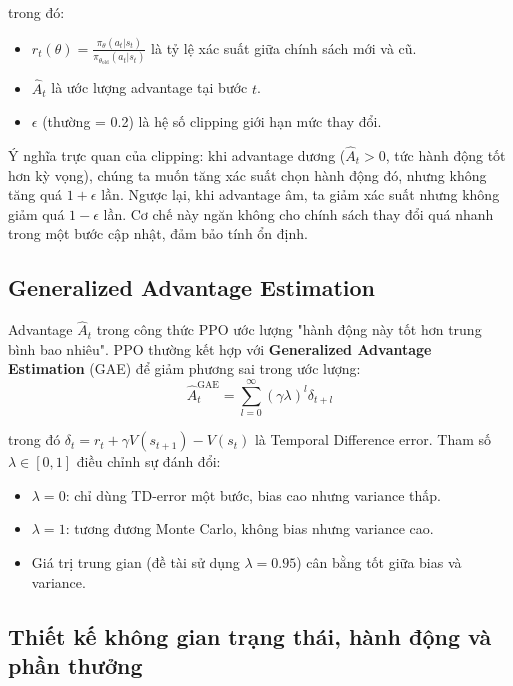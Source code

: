 trong đó:
\begin{itemize}
  \item $r_t(\theta) = \frac{\pi_\theta(a_t | s_t)}{\pi_{\theta_{\text{old}}}(a_t | s_t)}$ là tỷ lệ xác suất giữa chính sách mới và cũ.
  \item $\hat{A}_t$ là ước lượng advantage tại bước $t$.
  \item $\epsilon$ (thường = 0.2) là hệ số clipping giới hạn mức thay đổi.
\end{itemize}

Ý nghĩa trực quan của clipping: khi advantage dương ($\hat{A}_t > 0$, tức hành động tốt hơn kỳ vọng), chúng ta muốn tăng xác suất chọn hành động đó, nhưng không tăng quá $1 + \epsilon$ lần. Ngược lại, khi advantage âm, ta giảm xác suất nhưng không giảm quá $1 - \epsilon$ lần. Cơ chế này ngăn không cho chính sách thay đổi quá nhanh trong một bước cập nhật, đảm bảo tính ổn định.

\subsection{Generalized Advantage Estimation}

Advantage $\hat{A}_t$ trong công thức PPO ước lượng "hành động này tốt hơn trung bình bao nhiêu". PPO thường kết hợp với \textbf{Generalized Advantage Estimation} (GAE) để giảm phương sai trong ước lượng:
\begin{equation}
  \hat{A}_t^{\text{GAE}} = \sum_{l=0}^{\infty} (\gamma \lambda)^l \delta_{t+l}
\end{equation}

trong đó $\delta_t = r_t + \gamma V(s_{t+1}) - V(s_t)$ là Temporal Difference error. Tham số $\lambda \in [0, 1]$ điều chỉnh sự đánh đổi:
\begin{itemize}
  \item $\lambda = 0$: chỉ dùng TD-error một bước, bias cao nhưng variance thấp.
  \item $\lambda = 1$: tương đương Monte Carlo, không bias nhưng variance cao.
  \item Giá trị trung gian (đề tài sử dụng $\lambda = 0.95$) cân bằng tốt giữa bias và variance.
\end{itemize}

\subsection{Thiết kế không gian trạng thái, hành động và phần thưởng}

